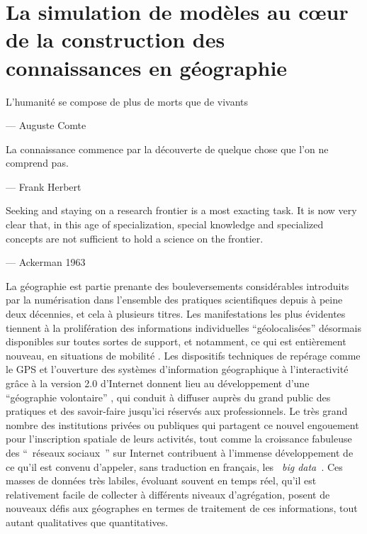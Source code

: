 \graphicspath{{FigureIntroduction/}}

\chapter{La simulation de modèles au cœur de la construction des connaissances en géographie}

\startcontents[chapters]
\Mprintcontents


\epigraph {L'humanité se compose de plus de morts que de vivants } { --- \textup{Auguste Comte}}

\epigraph {La connaissance commence par la découverte de quelque chose que l'on ne comprend pas.  } { --- \textup{Frank Herbert}}

\epigraph {Seeking and staying on a research frontier is a most exacting task. It is now very clear that, in this age of specialization, special knowledge and specialized concepts are not sufficient to hold a science on the frontier.}{ --- \textup{Ackerman 1963}}


La géographie est partie prenante des bouleversements considérables introduits par la numérisation dans l’ensemble des pratiques scientifiques depuis à peine deux décennies, et cela à plusieurs titres. Les manifestations les plus évidentes tiennent à la prolifération des informations individuelles \enquote{géolocalisées} désormais disponibles sur toutes sortes de support, et notamment, ce qui est entièrement nouveau, en situations de mobilité \autocite{FenChong2012}. Les dispositifs techniques de repérage comme le GPS et l’ouverture des systèmes d’information géographique à l’interactivité grâce à la version 2.0 d’Internet donnent lieu au développement d’une \enquote{géographie volontaire} \autocite{Goodchild2007}, qui conduit à diffuser auprès du grand public des pratiques et des savoir-faire jusqu’ici réservés aux professionnels. Le très grand nombre des institutions privées ou publiques qui partagent ce nouvel engouement pour l’inscription spatiale de leurs activités, tout comme la croissance fabuleuse des \enquote{ réseaux sociaux } sur Internet  contribuent à l’immense développement de ce qu’il est convenu d’appeler, sans traduction en français, les \textit{ big data }. Ces masses de données très labiles, évoluant souvent en temps réel, qu’il est relativement facile de collecter à différents niveaux d’agrégation, posent de nouveaux défis aux géographes en termes de traitement de ces informations, tout autant qualitatives que quantitatives.

